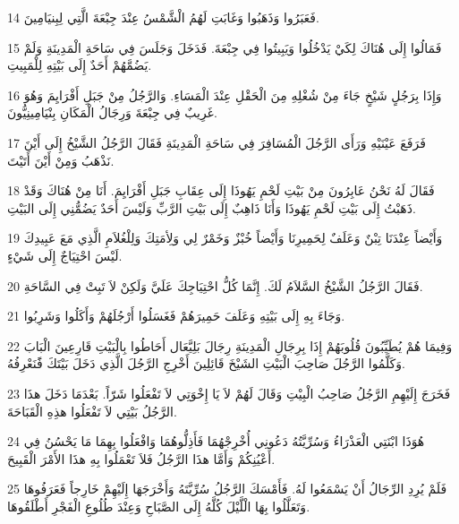 \par 14 فَعَبَرُوا وَذَهَبُوا وَغَابَتِ لَهُمُ الْشَّمْسُ عِنْدَ جِبْعَةَ الَّتِي لِبِنيَامِينَ.
\par 15 فَمَالُوا إِلَى هُنَاكَ لِكَيْ يَدْخُلُوا وَيَبِيتُوا فِي جِبْعَةَ. فَدَخَلَ وَجَلَسَ فِي سَاحَةِ الْمَدِينَةِ وَلَمْ يَضُمَّهُمْ أَحَدٌ إِلَى بَيْتِهِ لِلْمَبِيتِ.
\par 16 وَإِذَا بِرَجُلٍ شَيْخٍ جَاءَ مِنْ شُغْلِهِ مِنَ الْحَقْلِ عِنْدَ الْمَسَاءِ. وَالرَّجُلُ مِنْ جَبَلِ أَفْرَايِمَ وَهُوَ غَرِيبٌ فِي جِبْعَةَ وَرِجَالُ الْمَكَانِ بِنْيَامِينِيُّونَ.
\par 17 فَرَفَعَ عَيْنَيْهِ وَرَأَى الرَّجُلَ الْمُسَافِرَ فِي سَاحَةِ الْمَدِينَةِ فَقَالَ الرَّجُلُ الشَّيْخُ إِلَى أَيْنَ نَذْهَبُ وَمِنْ أَيْنَ أَتَيْتَ.
\par 18 فَقَالَ لَهُ نَحْنُ عَابِرُونَ مِنْ بَيْتِ لَحْمِ يَهُوذَا إِلَى عِقَابِ جَبَلِ أَفْرَايِمَ. أَنَا مِنْ هُنَاكَ وَقَدْ ذَهَبْتُ إِلَى بَيْتِ لَحْمِ يَهُوذَا وَأَنَا ذَاهِبٌ إِلَى بَيْتِ الرَّبِّ وَلَيْسَ أَحَدٌ يَضُمُّنِي إِلَى البَيْتِ.
\par 19 وَأَيْضاً عِنْدَنَا تِبْنٌ وَعَلَفٌ لِحَمِيرِنَا وَأَيْضاً خُبْزٌ وَخَمْرٌ لِي وَلِأمَتِكَ وَلِلْغُلاَمِ الَّذِي مَعَ عَبِيدِكَ لَيْسَ احْتِيَاجٌ إِلَى شَيْءٍ.
\par 20 فَقَالَ الرَّجُلُ الشَّيْخُ السَّلاَمُ لَكَ. إِنَّمَا كُلُّ احْتِيَاجِكَ عَلَيَّ وَلَكِنْ لاَ تَبِتْ فِي السَّاحَةِ.
\par 21 وَجَاءَ بِهِ إِلَى بَيْتِهِ وَعَلَفَ حَمِيرَهُمْ فَغَسَلُوا أَرْجُلَهُمْ وَأَكَلُوا وَشَرِبُوا.
\par 22 وَفِيمَا هُمْ يُطَيِّبُونَ قُلُوبَهُمْ إِذَا بِرِجَالِ الْمَدِينَةِ رِجَالَ بَلِيَّعَال أَحَاطُوا بِالْبَيْتِ قَارِعِينَ الْبَابَ وَكَلَّمُوا الرَّجُلَ صَاحِبَ الْبَيْتِ الشَيْخَ قَائِلِينَ أَخْرِجِ الرَّجُلَ الَّذِي دَخَلَ بَيْتَكَ فًَنَعْرِفُهُ.
\par 23 فَخَرَجَ إِلَيْهِمِ الرَّجُلُ صَاحِبُ الْبِيْتِ وَقَالَ لَهُمْ لاَ يَا إِخْوَتِي لاَ تَفْعَلُوا شَرّاً. بَعْدَمَا دَخَلَ هذَا الرَّجُلُ بَيْتِي لاَ تَفْعَلُوا هذِهِ الْقَبَاحَةَ.
\par 24 هُوَذَا ابْنَتِي الْعَذْرَاءُ وَسُرِّيَّتُهُ دَعُونِي أُخْرِجْهُمَا فَأَذِلُّوهُمَا وَافْعَلُوا بِهِمَا مَا يَحْسُنُ فِي أَعْيُنِكُمْ وَأَمَّا هذَا الرَّجُلُ فَلاَ تَعْمَلُوا بِهِ هذَا الأَمْرَ الْقَبِيحَ.
\par 25 فَلَمْ يُرِدِ الرِّجَالُ أَنْ يَسْمَعُوا لَهُ. فَأَمْسَكَ الرَّجُلُ سُرِّيَّتَهُ وَأَخْرَجَهَا إِلَيْهِمْ خَارِجاً فَعَرَفُوهَا وَتَعَلَّلُوا بِهَا الْلَّيْلَ كُلَّهُ إِلَى الصَّبَاحِ وَعِنْدَ طُلُوعِ الْفَجْرِ أَطْلَقُوهَا.
